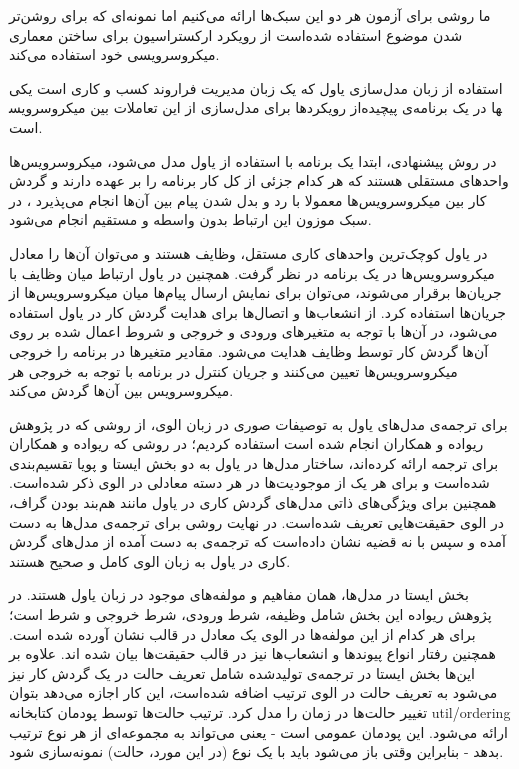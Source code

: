 ما روشی برای آزمون هر دو این سبک‌ها ارائه می‌کنیم اما نمونه‌ای که برای روشن‌تر شدن موضوع استفاده شده‌است از رویکرد ارکستراسیون برای ساختن معماری میکروسرویسی خود استفاده می‌کند. 

استفاده از زبان‌ مدل‌سازی یاول که یک زبان مدیریت فراروند کسب و کاری است یکی از رویکردها برای مدل‌سازی از این تعاملات بین میکروسرویس‎ها در یک برنامه‌ی پیچیده است.

در روش پیشنهادی، ابتدا یک برنامه با استفاده از یاول مدل می‌شود، میکروسرویس‌ها واحد‌های مستقلی هستند که هر کدام جزئی از کل کار برنامه را بر عهده دارند و گردش کار بین میکروسرویس‌ها معمولا با رد و بدل شدن پیام بین آن‌ها انجام می‌پذیرد ،
 در سبک موزون این ارتباط بدون واسطه و مستقیم انجام می‌شود. 
 
 در یاول کوچک‌ترین واحدهای کاری مستقل، وظایف هستند و می‌توان آن‌ها را معادل میکروسرویس‌ها در یک برنامه در نظر گرفت. 
 همچنین در یاول ارتباط میان وظایف با جریان‌ها برقرار می‌شوند،  می‌توان برای نمایش ارسال پیام‌ها میان میکروسرویس‌ها از جریان‌ها استفاده کرد. 
 از انشعاب‌ها و اتصال‌ها برای هدایت گردش کار در یاول استفاده می‌شود، در آن‌ها با توجه به متغیر‌های ورودی و خروجی و شروط اعمال شده بر روی آن‌ها گردش کار توسط وظایف هدایت می‌شود. 
 مقادیر متغیرها در برنامه را خروجی میکروسرویس‌ها تعیین می‌کنند و جریان کنترل در برنامه با توجه به خروجی هر میکروسرویس بین آن‌ها گردش می‌کند. 

  
  
برای ترجمه‌ی مدل‌های یاول به توصیفات صوری در زبان الوی، از روشی که در پژوهش ریواده و همکاران انجام شده است استفاده کردیم؛
 در روشی که ریواده و همکاران برای ترجمه ارائه کرده‌اند، ساختار مدل‌ها در یاول به دو بخش ایستا و پویا تقسیم‌بندی شده‌است و برای هر یک از موجودیت‌ها در هر دسته معادلی در الوی ذکر شده‌است. 
 همچنین برای ویژگی‌های ذاتی مدل‌های گردش کاری در یاول مانند هم‌بند بودن گراف، در الوی حقیقت‌هایی تعریف شده‌است.
  در نهایت روشی برای ترجمه‌ی مدل‌ها به دست آمده و سپس با نه قضیه نشان داده‌است که ترجمه‌ی به دست آمده از مدل‌های گردش کاری در یاول به زبان الوی کامل و صحیح هستند.
  
بخش ایستا در مدل‌ها، همان مفاهیم و مولفه‌های موجود در زبان یاول هستند. در پژوهش ریواده این بخش شامل وظیفه، شرط ورودی، شرط خروجی و شرط است؛ 
برای هر کدام از این مولفه‌ها در الوی یک معادل در قالب نشان آورده شده است. همچنین رفتار انواع پیوندها و انشعاب‌ها نیز در قالب حقیقت‌ها بیان شده اند. 
علاوه بر این‌ها بخش ایستا در ترجمه‌ی تولید‌شده شامل تعریف حالت در یک گردش کار نیز می‌شود به تعریف حالت در الوی ترتیب اضافه شده‌است، 
این کار اجازه می‌دهد بتوان تغییر حالت‌ها در زمان را مدل کرد. ترتیب حالت‌ها توسط پودمان کتابخانه util/ordering ارائه می‌شود. این پودمان عمومی است - یعنی می‌تواند به مجموعه‌ای از هر نوع ترتیب بدهد - بنابراین وقتی باز می‌شود باید با یک نوع (در این مورد، حالت) نمونه‌سازی شود.

